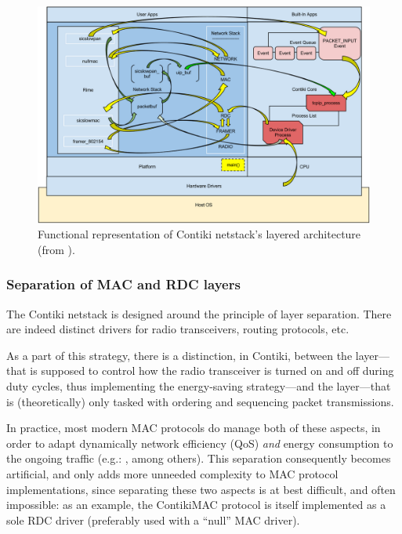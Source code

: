 \documentclass[12pt,a4paper]{article}
\begin{document}
\begin{figure}[!t]
\centering
\includegraphics[width=13.5cm]{ContikiNetstack.png}
\caption{Functional representation of Contiki netstack's layered architecture
         (from \cite{judit-blog}).}
\label{contiki-netstack}
\end{figure}


\subsubsection{Separation of MAC and RDC layers}

The Contiki netstack is designed around the principle of layer separation.
There are indeed distinct drivers for radio transceivers, routing protocols,
etc.

As a part of this strategy, there is a distinction, in Contiki, between
the  layer---that is supposed to control
how the radio transceiver is turned on and off during duty cycles, thus
implementing the energy-saving strategy---and the  layer---that is (theoretically) only tasked with
ordering and sequencing packet transmissions.

In practice, most modern MAC protocols do manage both of these aspects,
in order to adapt dynamically network efficiency (QoS) \emph{and} energy
consumption to the ongoing traffic (e.g.: \cite{x-mac} \cite{ri-mac}
\cite{cosens} \cite{iqueue-mac}, among others). This separation consequently
becomes artificial, and only adds more unneeded complexity to MAC protocol
implementations, since separating these two aspects is at best difficult,
and often impossible: as an example, the ContikiMAC protocol is itself
implemented as a sole RDC driver (preferably used with a ``null'' MAC
driver).
\end{document}
